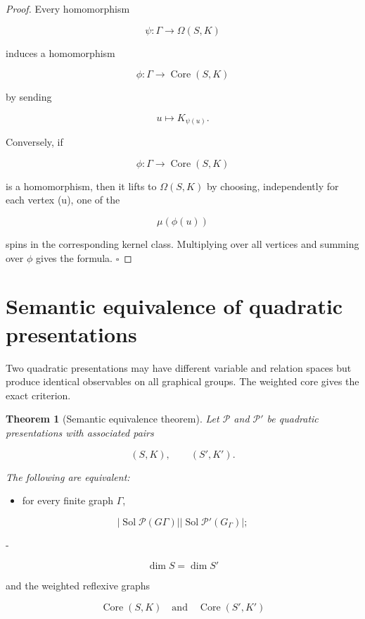 \documentclass[11pt]{article}
\newtheorem{theorem}{Theorem}[section]
\begin{document}
\begin{proof}
Every homomorphism

\[
\psi:\Gamma\to\Omega(S,K)
\]

induces a homomorphism

\[
\phi:\Gamma\to\operatorname{Core}(S,K)
\]

by sending

\[
u\mapsto K_{\psi(u)}.
\]

Conversely, if

\[
\phi:\Gamma\to\operatorname{Core}(S,K)
\]

is a homomorphism, then it lifts to $\Omega(S,K)$ by choosing, independently for each vertex (u), one of the

\[
\mu(\phi(u))
\]

spins in the corresponding kernel class. Multiplying over all vertices and summing over $\phi$ gives the formula. $\square$

\end{proof}

\section{Semantic equivalence of quadratic presentations}

Two quadratic presentations may have different variable and relation spaces but produce identical observables on all graphical groups. The weighted core gives the exact criterion.

\begin{theorem}[Semantic equivalence theorem]
Let $\mathcal P$ and $\mathcal P'$ be quadratic presentations with associated pairs

\[
(S,K),
\qquad
(S',K').
\]

The following are equivalent:

\end{theorem}

\begin{itemize}
\item for every finite graph $\Gamma$,
\end{itemize}

\[
|\operatorname{Sol}
{\mathcal P}(G
\Gamma)|
|\operatorname{Sol}{\mathcal P'}(G_\Gamma)|;
\]

-

\[
\dim S=\dim S'
\]

and the weighted reflexive graphs

\[
\operatorname{Core}(S,K)
\quad\text{and}\quad
\operatorname{Core}(S',K')
\]
\end{document}

